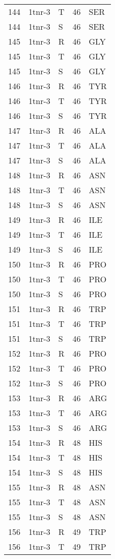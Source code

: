 \begin{tiny}
\begin{longtable}[l]{l|l|l|l|l}
	144 & 1tnr-3 & T & 46 & SER \\
	144 & 1tnr-3 & S & 46 & SER \\
	145 & 1tnr-3 & R & 46 & GLY \\
	145 & 1tnr-3 & T & 46 & GLY \\
	145 & 1tnr-3 & S & 46 & GLY \\
	146 & 1tnr-3 & R & 46 & TYR \\
	146 & 1tnr-3 & T & 46 & TYR \\
	146 & 1tnr-3 & S & 46 & TYR \\
	147 & 1tnr-3 & R & 46 & ALA \\
	147 & 1tnr-3 & T & 46 & ALA \\
	147 & 1tnr-3 & S & 46 & ALA \\
	148 & 1tnr-3 & R & 46 & ASN \\
	148 & 1tnr-3 & T & 46 & ASN \\
	148 & 1tnr-3 & S & 46 & ASN \\
	149 & 1tnr-3 & R & 46 & ILE \\
	149 & 1tnr-3 & T & 46 & ILE \\
	149 & 1tnr-3 & S & 46 & ILE \\
	150 & 1tnr-3 & R & 46 & PRO \\
	150 & 1tnr-3 & T & 46 & PRO \\
	150 & 1tnr-3 & S & 46 & PRO \\
	151 & 1tnr-3 & R & 46 & TRP \\
	151 & 1tnr-3 & T & 46 & TRP \\
	151 & 1tnr-3 & S & 46 & TRP \\
	152 & 1tnr-3 & R & 46 & PRO \\
	152 & 1tnr-3 & T & 46 & PRO \\
	152 & 1tnr-3 & S & 46 & PRO \\
	153 & 1tnr-3 & R & 46 & ARG \\
	153 & 1tnr-3 & T & 46 & ARG \\
	153 & 1tnr-3 & S & 46 & ARG \\
	154 & 1tnr-3 & R & 48 & HIS \\
	154 & 1tnr-3 & T & 48 & HIS \\
	154 & 1tnr-3 & S & 48 & HIS \\
	155 & 1tnr-3 & R & 48 & ASN \\
	155 & 1tnr-3 & T & 48 & ASN \\
	155 & 1tnr-3 & S & 48 & ASN \\
	156 & 1tnr-3 & R & 49 & TRP \\
	156 & 1tnr-3 & T & 49 & TRP \\

\end{longtable}
\end{tiny}
